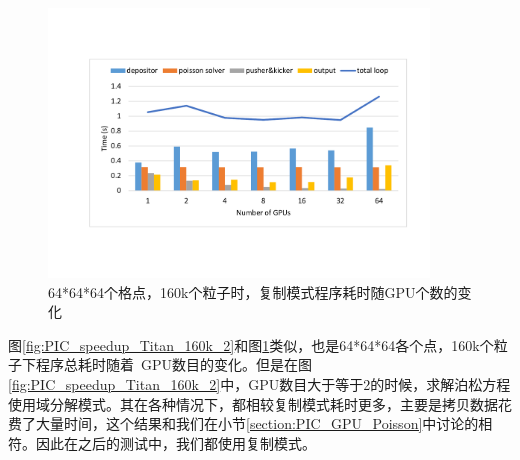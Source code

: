 \begin{figure}[!htb]
  \centering
  \includegraphics[width=0.9\textwidth]{Img/PIC_speedup_Titan_160k_1.pdf}
  \caption{64*64*64个格点，160k个粒子时，复制模式程序耗时随GPU个数的变化}
  \label{fig:PIC_speedup_Titan_160k_1}
\end{figure}

图\ref{fig:PIC_speedup_Titan_160k_2}和图\ref{fig:PIC_speedup_Titan_160k_1}类似，也是64*64*64各个点，160k个粒子下程序总耗时随着~GPU数目的变化。但是在图\ref{fig:PIC_speedup_Titan_160k_2}中，GPU数目大于等于2的时候，求解泊松方程使用域分解模式。其在各种情况下，都相较复制模式耗时更多，主要是拷贝数据花费了大量时间，这个结果和我们在小节\ref{section:PIC_GPU_Poisson}中讨论的相符。因此在之后的测试中，我们都使用复制模式。

